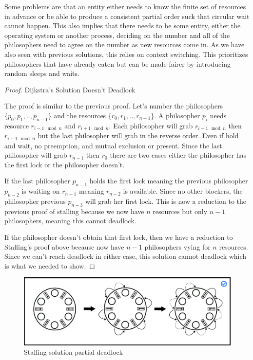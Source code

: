 Some problems are that an entity either needs to know the finite set of resources in advance or be able to produce a consistent partial order suck that circular wait cannot happen.
This also implies that there needs to be some entity, either the operating system or another process, deciding on the number and all of the philosophers need to agree on the number as new resources come in.
As we have also seen with previous solutions, this relies on context switching.
This prioritizes philosophers that have already eaten but can be made fairer by introducing random sleeps and waits.

\begin{proof} Dijkstra's Solution Doesn't Deadlock
	
	The proof is similar to the previous proof.
	Let's number the philosophers $\{p_0, p_1, .., p_{n-1}\}$ and the resources $\{r_0, r_1, .., r_{n-1}\}$.
	A philosopher $p_i$ needs resource $r_{i-1 \mod n}$ and $r_{i + 1 \mod n}$.
	Each philosopher will grab $r_{i-1 \mod n}$ then $r_{i + 1 \mod n}$ but the last philosopher will grab in the reverse order.
	Even if hold and wait, no preemption, and mutual exclusion or present.
	Since the last philosopher will grab $r_{n-1}$ then $r_0$ there are two cases either the philosopher has the first lock or the philosopher doesn't.
	
	If the last philosopher $p_{n-1}$ holds the first lock meaning the previous philosopher $p_{n-2}$ is waiting on $r_{n-1}$ meaning $r_{n-2}$ is available.
	Since no other blockers, the philosopher previous $p_{n-3}$ will grab her first lock.
	This is now a reduction to the previous proof of stalling because we now have $n$ resources but only $n-1$ philosophers, meaning this cannot deadlock.
	
	If the philosopher doesn't obtain that first lock, then we have a reduction to Stalling's proof above because now have $n-1$ philosophers vying for $n$ resources.
	Since we can't reach deadlock in either case, this solution cannot deadlock which is what we needed to show.
	
\end{proof}

\begin{figure}[H]
	\centering
	\includegraphics[width=.9\textwidth]{deadlock/drawings/dining_partial.eps}
	\caption{Stalling solution partial deadlock}
\end{figure}


